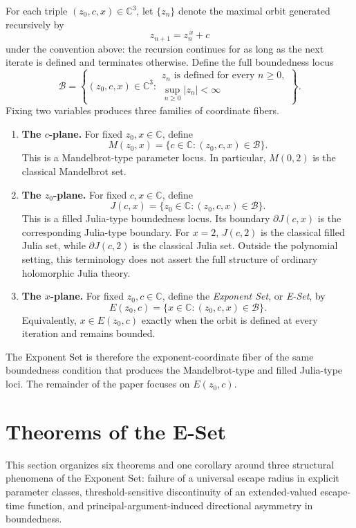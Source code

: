 \documentclass[12pt,a4paper]{amsart}
\theoremstyle{remark}
\newcommand{\C}{\mathbb{C}}
\begin{document}
For each triple $(z_0,c,x)\in\C^3$, let $\{z_n\}$ denote the maximal orbit
generated recursively by
\[
z_{n+1}=z_n^{\,x}+c
\]
under the convention above: the recursion continues for as long as the next
iterate is defined and terminates otherwise. Define the full boundedness locus
\[
\mathcal{B}
=
\left\{(z_0,c,x)\in\C^3:
\begin{array}{l}
z_n\text{ is defined for every }n\ge0,\\
\displaystyle\sup_{n\ge0}|z_n|<\infty
\end{array}
\right\}.
\]
Fixing two variables produces three families of coordinate fibers.

\begin{enumerate}
    \item \textbf{The $c$-plane.}
    For fixed $z_0,x\in\C$, define
    \[
    M(z_0,x)=\{c\in\C:(z_0,c,x)\in\mathcal{B}\}.
    \]
    This is a Mandelbrot-type parameter locus. In particular, $M(0,2)$ is the
    classical Mandelbrot set.

    \item \textbf{The $z_0$-plane.}
    For fixed $c,x\in\C$, define
    \[
    J(c,x)=\{z_0\in\C:(z_0,c,x)\in\mathcal{B}\}.
    \]
    This is a filled Julia-type boundedness locus. Its boundary
    $\partial J(c,x)$ is the corresponding Julia-type boundary. For $x=2$,
    $J(c,2)$ is the classical filled Julia set, while $\partial J(c,2)$ is the
    classical Julia set. Outside the polynomial setting, this terminology does
    not assert the full structure of ordinary holomorphic Julia theory.

    \item \textbf{The $x$-plane.}
    For fixed $z_0,c\in\C$, define the \emph{Exponent Set}, or \emph{E-Set}, by
    \[
    E(z_0,c)=\{x\in\C:(z_0,c,x)\in\mathcal{B}\}.
    \]
    Equivalently, $x\in E(z_0,c)$ exactly when the orbit is defined at every
    iteration and remains bounded.
\end{enumerate}

The Exponent Set is therefore the exponent-coordinate fiber of the same
boundedness condition that produces the Mandelbrot-type and filled Julia-type
loci. The remainder of the paper focuses on $E(z_0,c)$.

\section{Theorems of the E-Set}
This section organizes six theorems and one corollary around three structural
phenomena of the Exponent Set: failure of a universal escape radius in
explicit parameter classes, threshold-sensitive discontinuity of an
extended-valued escape-time function, and principal-argument-induced directional
asymmetry in boundedness.
\end{document}
